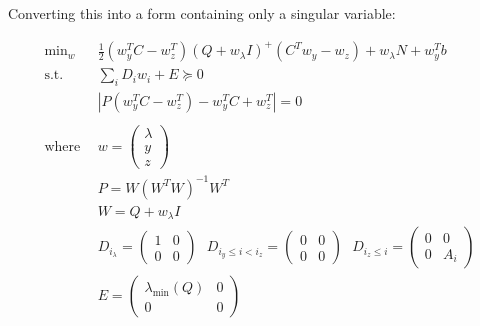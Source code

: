 \documentclass{article}
\begin{document}
Converting this into a form containing only a singular variable:

\begin{align}
	\text{min}_{w} ~ &\frac{1}{2} (w_y^T C - w_z^T) (Q+w_\lambda I)^+ (C^Tw_y - w_z) + w_\lambda N + w_y^T b \\ 
	\text{s.t.} ~~ &\sum_i D_i w_i + E \succeq 0 \\
			    &|P(w_y^TC-w_z^T)-w_y^T C+w_z^T| = 0 \\ 
				\\
				\text{where} ~~ &w = \begin{pmatrix}\lambda \\ y \\ z \end{pmatrix} \\
				&P = W (W^T W)^{-1} W^T \\
								&W = Q+w_\lambda I \\
								&D_{i_\lambda} = \begin{pmatrix}1 & 0 \\ 0 & 0 \end{pmatrix} ~~~ D_{i_y\le i<i_z} = \begin{pmatrix}0 & 0 \\ 0 & 0 \end{pmatrix} ~~~ D_{i_z \le i} = \begin{pmatrix}0 & 0 \\ 0 & A_i \end{pmatrix} \\
								&E = \begin{pmatrix}\lambda_\text{min}(Q) & 0 \\ 0 & 0 \end{pmatrix} 
\end{align}
\end{document}
